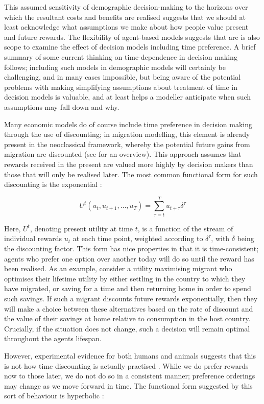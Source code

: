 \documentclass{article}
\begin{document}
This assumed sensitivity of demographic decision-making to the horizons over which the resultant costs and benefits are realised suggests that we should at least acknowledge what assumptions we make about how people value present and future rewards. The flexibility of agent-based models suggests that are is also scope to examine the effect of decision models including time preference. A brief summary of some current thinking on time-dependence in decision making follows; including such models in demographic models will certainly be challenging, and in many cases impossible, but being aware of the potential problems with making simplifying assumptions about treatment of time in decision models is valuable, and at least helps a modeller anticipate when such assumptions may fall down and why.

Many economic models do of course include time preference in decision making through the use of discounting; in migration modelling, this element is already present in the neoclassical framework, whereby the potential future gains from migration are discounted (see \citet{Massey1993} for an overview). This approach assumes that rewards received in the present are valued more highly by decision makers than those that will only be realised later. The most common functional form for such discounting is the exponential \citep{ODonoghue2000}:

\[
U^{t}(u_t, u_{t+1},\dots,u_T ) = \sum_{\tau=t}^{T} u_{t+\tau}\delta^{\tau}
\]

Here, \(U^t\), denoting present utility at time \(t\), is a function of the stream of individual rewards \(u_t\) at each time point, weighted  according to \(\delta^{\tau}\), with \(\delta\) being the discounting factor. This form has nice properties in that it is time-consistent; agents who prefer one option over another today will do so until the reward has been realised. As an example, consider a utility maximising migrant who optimises their lifetime utility by either settling in the country to which they have migrated, or saving for a time and then returning home in order to spend such savings. If such a migrant discounts future rewards exponentially, then they will make a choice between these alternatives based on the rate of discount and the value of their savings at home relative to consumption in the host country. Crucially, if the situation does not change, such a decision will remain optimal throughout the agents lifespan.

However, experimental evidence for both humans and animals suggests that this is not how time discounting is actually practised \citep{Boyer2008}. While we do prefer rewards now to those later, we do not do so in a consistent manner; preference orderings may change as we move forward in time. The functional form suggested by this sort of behaviour is hyperbolic \citep{Benhabib2010}:
\end{document}
